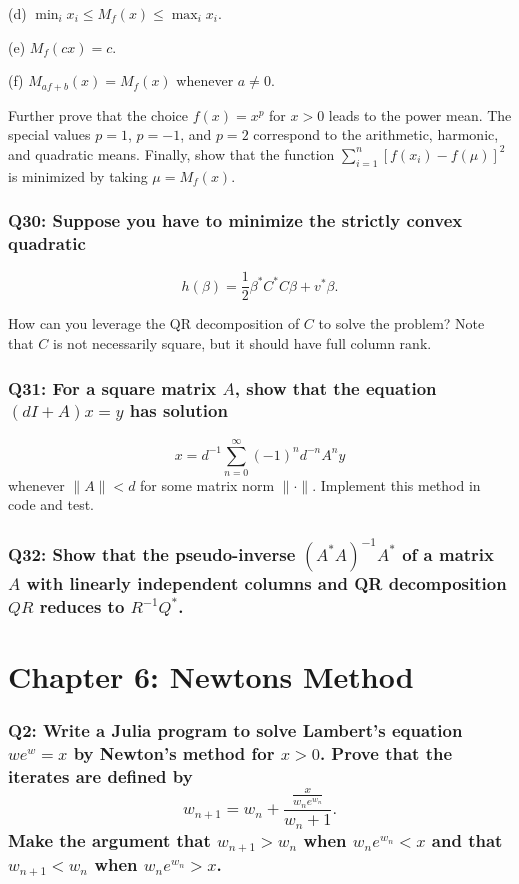 \documentclass[8pt]{article}
\begin{document}
(d) \( \min_i x_i \leq M_f(x) \leq \max_i x_i \).

(e) \( M_f(cx) = c \).

(f) \( M_{af+b}(x) = M_f(x) \) whenever \( a \neq 0 \).

Further prove that the choice \( f(x) = x^p \) for \( x > 0 \) leads to the power mean. The special values \( p = 1 \), \( p = -1 \), and \( p = 2 \) correspond to the arithmetic, harmonic, and quadratic means. Finally, show that the function \( \sum_{i=1}^n [f(x_i) - f(\mu)]^2 \) is minimized by taking \( \mu = M_f(x) \).

\subsubsection*{Q30: Suppose you have to minimize the strictly convex quadratic}
\[
h(\beta) = \frac{1}{2} \beta^* C^* C \beta + v^* \beta.
\]

How can you leverage the QR decomposition of \( C \) to solve the problem? Note that \( C \) is not necessarily square, but it should have full column rank.

\subsubsection*{Q31: For a square matrix \(A\), show that the equation \( (dI + A)x = y \) has solution}
\[
x = d^{-1} \sum_{n=0}^{\infty} (-1)^n d^{-n} A^n y
\]
whenever \( \|A\| < d \) for some matrix norm \( \| \cdot \| \). Implement this method in code and test.

\subsubsection*{Q32: Show that the pseudo-inverse \( (A^*A)^{-1}A^* \) of a matrix \(A\) with linearly independent columns and QR decomposition \(QR\) reduces to \(R^{-1}Q^*\).}

\newpage
\section*{Chapter 6: Newtons Method}
\subsubsection*{Q2: Write a Julia program to solve Lambert’s equation \(we^w = x\) by Newton’s method for \(x > 0\). Prove that the iterates are defined by
\[ w_{n+1} = w_n + \frac{\frac{x}{w_n e^{w_n}}}{w_n + 1}. \]
Make the argument that \(w_{n+1} > w_n\) when \(w_n e^{w_n} < x\) and that \(w_{n+1} < w_n\) when \(w_n e^{w_n} > x\).}
\end{document}
